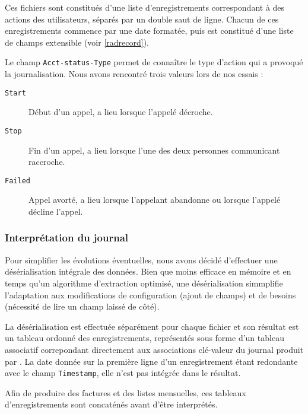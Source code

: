 
Ces fichiers sont constitués d’une liste d’enregistrements correspondant à des actions des utilisateurs, séparés par un double saut de ligne. Chacun de ces enregistrements commence par une date formatée, puis est constitué d’une liste de champs extensible (voir \cref{radrecord}).

Le champ \texttt{Acct-status-Type} permet de connaître le type d’action qui a provoqué la journalisation. Nous avons rencontré trois valeurs lors de nos essais :
\begin{description}
	\item[\texttt{Start}] Début d’un appel, a lieu lorsque l’appelé décroche.
	\item[\texttt{Stop}] Fin d’un appel, a lieu lorsque l’une des deux personnes communicant raccroche.
	\item[\texttt{Failed}] Appel avorté, a lieu lorsque l’appelant abandonne ou lorsque l’appelé décline l’appel.
\end{description}

\subsubsection{Interprétation du journal}

Pour simplifier les évolutions éventuelles, nous avons décidé d’effectuer une désérialisation intégrale des données. Bien que moins efficace en mémoire et en temps qu’un algorithme d’extraction optimisé, une désérialisation simmplifie l’adaptation aux modifications de configuration (ajout de champs) et de besoins (nécessité de lire un champ laissé de côté).

La désérialisation est effectuée séparément pour chaque fichier et son résultat est un tableau ordonné des enregistrements, représentés sous forme d’un tableau associatif correpondant directement aux associations clé-valeur du journal produit par {\frad}. La date donnée sur la première ligne d’un enregistrement étant redondante avec le champ \texttt{Timestamp}, elle n’est pas intégrée dans le résultat.

Afin de produire des factures et des listes mensuelles, ces tableaux d’enregistrements sont concaténés avant d’être interprétés.


